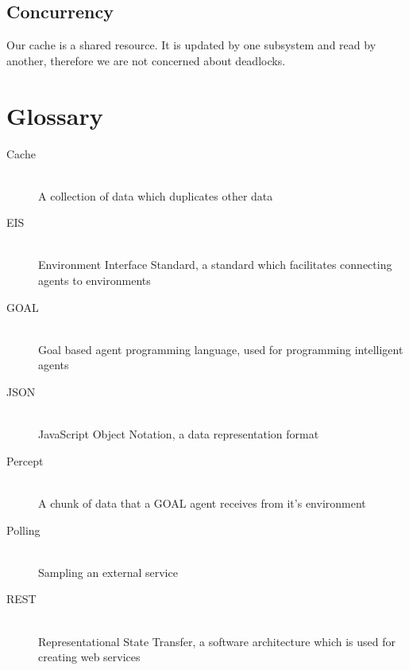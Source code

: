 \documentclass[a4paper]{article}
\begin{document}
\subsection{Concurrency}
Our cache is a shared resource. It is updated by one subsystem and read by another, therefore we are not concerned about deadlocks.

\clearpage
\section{Glossary}
\begin{description}
\item[Cache] \hfill \\
A collection of data which duplicates other data
\item[EIS] \hfill \\
Environment Interface Standard, a standard which facilitates connecting agents to environments
\item[GOAL] \hfill \\
Goal based agent programming language, used for programming intelligent agents
\item[JSON] \hfill \\
JavaScript Object Notation, a data representation format
\item[Percept] \hfill \\
A chunk of data that a GOAL agent receives from it’s environment
\item[Polling] \hfill \\
Sampling an external service
\item[REST] \hfill \\
Representational State Transfer, a software architecture which is used for creating web services
\end{description}
\end{document}
